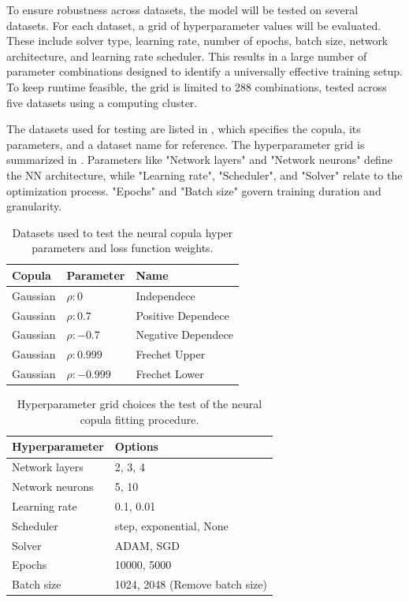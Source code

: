 To ensure robustness across datasets, the model will be tested on several datasets. For each dataset, a grid of hyperparameter values will be evaluated. These include solver type, learning rate, number of epochs, batch size, network architecture, and learning rate scheduler. This results in a large number of parameter combinations designed to identify a universally effective training setup. To keep runtime feasible, the grid is limited to 288 combinations, tested across five datasets using a computing cluster.

The datasets used for testing are listed in , which specifies the copula, its parameters, and a dataset name for reference. The hyperparameter grid is summarized in . Parameters like "Network layers" and "Network neurons" define the \gls{NN} architecture, while "Learning rate", "Scheduler", and "Solver" relate to the optimization process. "Epochs" and "Batch size" govern training duration and granularity.

\begin{table}[h!]
    \centering
    \caption{Datasets used to test the neural copula hyper parameters and loss function weights.}
    \begin{tabular}{lll}
    \textbf{Copula} & \textbf{Parameter} & \textbf{Name}  \\
    \hline
    Gaussian & $\rho:0$ & Independece \\
    Gaussian & $\rho:0.7$ & Positive Dependece \\
    Gaussian & $\rho:-0.7$ & Negative Dependece  \\
    Gaussian & $\rho:0.999$ & Frechet Upper \\
    Gaussian & $\rho:-0.999$ & Frechet Lower \\
    \end{tabular}
    \label{tab:DatasetsTestedOn}
\end{table}

\begin{table}[h!]
    \centering
    \caption{Hyperparameter grid choices the test of the neural copula fitting procedure.}
    \begin{tabular}{ll}
    \textbf{Hyperparameter} & \textbf{Options} \\
    \hline
    Network layers & 2, 3, 4 \\
    Network neurons & 5, 10 \\
    Learning rate & 0.1, 0.01 \\
    Scheduler & step, exponential, None \\
    Solver & ADAM, SGD \\
    Epochs & 10000, 5000 \\
    Batch size & 1024, 2048 (Remove batch size) \\
    \end{tabular}
    \label{tab:se_hyperparams}
\end{table}

